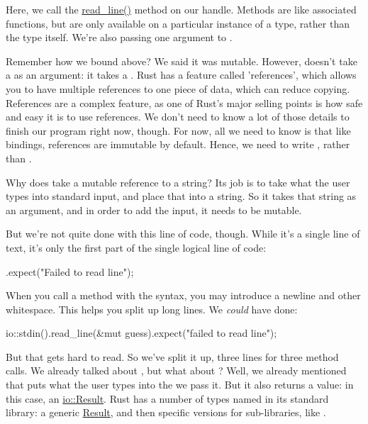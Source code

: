 Here, we call the \href{https://doc.rust-lang.org/std/io/struct.Stdin.html\#method.read\_line}{read\_line()} method on our handle.
Methods are like associated functions, but are only available on a particular instance of a type, rather than the type itself. 
We're also passing one argument to .

\blank

Remember how we bound  above? We said it was mutable. However,  doesn't take a  as 
an argument: it takes a . Rust has a feature called 'references', which allows you to have multiple references 
to one piece of data, which can reduce copying. References are a complex feature, as one of Rust's major selling points is how 
safe and easy it is to use references. We don't need to know a lot of those details to finish our program right now, though. 
For now, all we need to know is that like  bindings, references are immutable by default. Hence, we need to write 
, rather than .

\blank

Why does  take a mutable reference to a string? Its job is to take what the user types into standard input, 
and place that into a string. So it takes that string as an argument, and in order to add the input, it needs to be mutable.

\blank

But we're not quite done with this line of code, though. While it's a single line of text, it's only the first part of the 
single logical line of code:

\begin{rustc}
        .expect("Failed to read line");
\end{rustc}

When you call a method with the  syntax, you may introduce a newline and other whitespace. This helps you 
split up long lines. We \emph{could} have done:

\begin{rustc}
    io::stdin().read_line(&mut guess).expect("failed to read line");
\end{rustc}

But that gets hard to read. So we've split it up, three lines for three method calls. We already talked about ,
but what about ? Well, we already mentioned that  puts what the user types into the 
 we pass it. But it also returns a value: in this case, an 
\href{https://doc.rust-lang.org/std/io/type.Result.html}{io::Result}. Rust has a number of types named  in its 
standard library: a generic \href{https://doc.rust-lang.org/std/result/enum.Result.html}{Result}, and then specific versions 
for sub-libraries, like .

